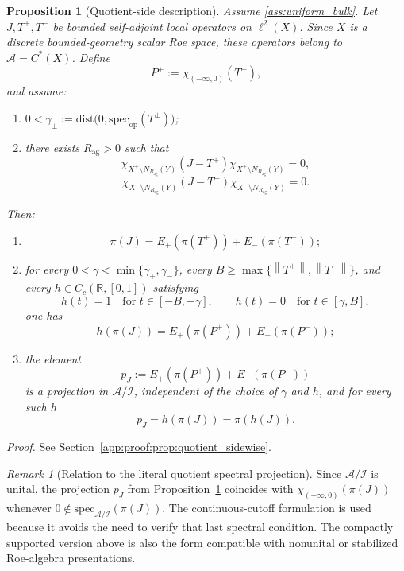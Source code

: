 \documentclass[11pt]{article}
\numberwithin{equation}{section}
\newtheorem{proposition}[theorem]{Proposition}
\theoremstyle{definition}
\theoremstyle{remark}
\newtheorem{remark}[theorem]{Remark}
\newcommand{\proofref}[1]{%
  \par\noindent\emph{Proof.} See Section~\ref{#1}.\par\medskip
}
\newcommand{\proofappendixref}[1]{\proofref{#1}}
\newcommand{\spec}{\mathrm{spec}}
\newcommand{\dist}{\mathrm{dist}}
\newcommand{\opnorm}[1]{\left\lVert#1\right\rVert}
\begin{document}
\begin{proposition}[Quotient-side description]\label{prop:quotient_sidewise}
Assume \ref{ass:uniform_bulk}. Let $J,T^+,T^-$ be bounded self-adjoint local operators on
\(\ell^2(X)\). Since \(X\) is a discrete bounded-geometry scalar Roe space, these operators belong
to \(\mathcal A=C^*(X)\). Define
\[
P^\pm:=\chi_{(-\infty,0)}(T^\pm),
\]
and assume:
\begin{enumerate}[label=(\alph*),leftmargin=2em]
\item $0<\gamma_\pm:=\dist\bigl(0,\spec_{\mathrm{op}}(T^\pm)\bigr)$;
\item there exists $R_{\mathrm{ag}}>0$ such that
\[
\chi_{X^+\setminus N_{R_{\mathrm{ag}}}(Y)}(J-T^+)\chi_{X^+\setminus N_{R_{\mathrm{ag}}}(Y)}=0,
\]
\[
\chi_{X^-\setminus N_{R_{\mathrm{ag}}}(Y)}(J-T^-)\chi_{X^-\setminus N_{R_{\mathrm{ag}}}(Y)}=0.
\]
\end{enumerate}
Then:
\begin{enumerate}[label=(\roman*),leftmargin=2em]
\item
\[
\pi(J)=E_+(\pi(T^+))+E_-(\pi(T^-));
\]
\item for every $0<\gamma<\min\{\gamma_+,\gamma_-\}$, every
$B\ge \max\{\opnorm{T^+},\opnorm{T^-}\}$, and every $h\in C_c(\mathbb R,[0,1])$ satisfying
\[
h(t)=1\quad\text{for }t\in[-B,-\gamma],
\qquad
h(t)=0\quad\text{for }t\in[\gamma,B],
\]
one has
\[
h(\pi(J))
=
E_+(\pi(P^+))+E_-(\pi(P^-));
\]
\item the element
\[
p_J:=E_+(\pi(P^+))+E_-(\pi(P^-))
\]
is a projection in $\mathcal A/\mathcal I$, independent of the choice of $\gamma$ and $h$, and for every such $h$
\[
p_J=h(\pi(J))=\pi(h(J)).
\]
\end{enumerate}
\end{proposition}
\proofappendixref{app:proof:prop:quotient_sidewise}




\begin{remark}[Relation to the literal quotient spectral projection]\label{rem:literal_quotient_projection}
Since $\mathcal A/\mathcal I$ is unital, the projection $p_J$ from
Proposition~\ref{prop:quotient_sidewise} coincides with $\chi_{(-\infty,0)}(\pi(J))$ whenever
$0\notin\spec_{\mathcal A/\mathcal I}(\pi(J))$. The continuous-cutoff formulation is used because
it avoids the need to verify that last spectral condition. The compactly supported version above is
also the form compatible with nonunital or stabilized Roe-algebra presentations.
\end{remark}
\end{document}
